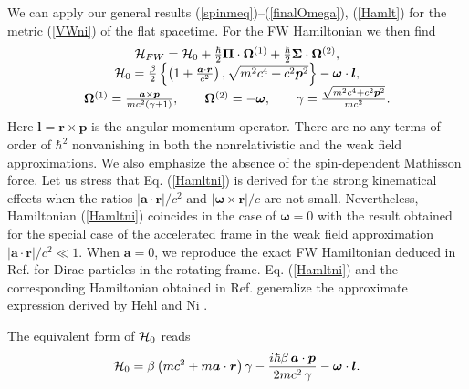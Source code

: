\documentclass[preprint,showpacs,preprintnumbers,eqsecnum,amsmath,amssymb]{revtex4}
\begin{document}
We can apply our general results (\ref{spinmeq})--(\ref{finalOmega}), 
(\ref{Hamlt}) for the metric (\ref{VWni}) of the flat spacetime. 
For the FW Hamiltonian we then find
\begin{equation}
\begin{array}{c}
{\cal H}_{FW}={\cal H}_{0}+\frac\hbar2\bm\Pi\cdot\bm\Omega^{(1)}+
\frac\hbar2\bm\Sigma\cdot\bm\Omega^{(2)},\\
{\cal H}_{0}=\frac\beta2\left\{\left(1+\frac{\bm a\cdot\bm r}{c^2}\right),
\sqrt{m^2c^4+c^2\bm p^2}\right\}-\bm\omega\cdot\bm l,\\
\bm\Omega^{(1)}= \frac{\bm a\times\bm p}{mc^2(\gamma+1)},\qquad\bm\Omega^{(2)}
=-\bm\omega,\qquad\gamma=\frac{\sqrt{m^2c^4+c^2\bm p^2}}{mc^2}.
\end{array}\label{Hamltni}
\end{equation}
Here ${\bm l} = {\bm r}\times{\bm p}$ is the angular momentum
operator. There are no any terms of order of $\hbar^2$
nonvanishing in both the nonrelativistic and the weak field
approximations. We also emphasize the absence of the
spin-dependent Mathisson force. Let us stress that Eq.
(\ref{Hamltni}) is derived for the strong kinematical effects when
the ratios $|\bm a\cdot \bm r|/c^2$ and $|\bm\omega\times\bm r|/c$
are not small. Nevertheless, Hamiltonian (\ref{Hamltni}) coincides
in the case of $\bm\omega=0$ with the result \cite{PRD} obtained
for the special case of the accelerated frame in the weak field
approximation $|\bm a\cdot\bm r|/c^2\ll1$. When $\bm a=0$, we
reproduce the exact FW Hamiltonian deduced in Ref. \cite{PRD2} for
Dirac particles in the rotating frame. Eq. (\ref{Hamltni}) and the
corresponding Hamiltonian obtained in Ref. \cite{PRD2} generalize
the approximate expression derived by Hehl and Ni \cite{HN}.

The equivalent form of ${\cal H}_{0}$ reads
\begin{equation}
{\cal H}_{0} = \beta\left(mc^2 + m{\bm a}\cdot{\bm r}\right)\gamma
- {\frac {i\hbar\beta\,{\bm a}\cdot{\bm p}}{2mc^2\,\gamma}} -
{\bm\omega}\cdot{\bm l}.\label{H0a}
\end{equation}
\end{document}
